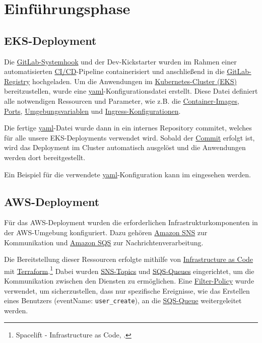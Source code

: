 \section{Einführungsphase}
\label{sec:Einfuehrungsphase}

\subsection{EKS-Deployment}
\label{sec:EKSDeployment}

Die \hyperlink{GitLabSystemhooks}{\textcolor{AOBlau}{GitLab-Systemhook}} und der Dev-Kickstarter wurden im Rahmen einer automatisierten \hyperlink{CI}{\textcolor{AOBlau}{CI/CD}}-Pipeline containerisiert und anschließend in die \hyperlink{GitLab}{\textcolor{AOBlau}{GitLab-Registry}} hochgeladen. Um die Anwendungen im \hyperlink{EKS}{\textcolor{AOBlau}{Kubernetes-Cluster (EKS)}} bereitzustellen, wurde eine \hyperlink{YAML}{\textcolor{AOBlau}{yaml}}-Konfigurationsdatei erstellt. Diese Datei definiert alle notwendigen Ressourcen und Parameter, wie z.B. die \hyperlink{ContainerImage}{\textcolor{AOBlau}{Container-Images}}, \hyperlink{Ports}{\textcolor{AOBlau}{Ports}}, \hyperlink{Umgebungsvariablen}{\textcolor{AOBlau}{Umgebungsvariablen}} und \hyperlink{KubernetesIngress}{\textcolor{AOBlau}{Ingress-Konfigurationen}}.

Die fertige \hyperlink{GitCommit}{\textcolor{AOBlau}{yaml}}-Datei wurde dann in ein internes Repository commitet, welches für alle unsere EKS-Deployments verwendet wird. Sobald der \hyperlink{GitCommit}{\textcolor{AOBlau}{Commit}} erfolgt ist, wird das Deployment im Cluster automatisch ausgelöst und die Anwendungen werden dort bereitgestellt. 

Ein Beispiel für die verwendete \hyperlink{YAML}{\textcolor{AOBlau}{yaml}}-Konfiguration kann im  eingesehen werden.

\subsection{AWS-Deployment}
\label{sec:AWSDeployment}

Für das AWS-Deployment wurden die erforderlichen Infrastrukturkomponenten in der AWS-Umgebung konfiguriert. Dazu gehören \hyperlink{SNS}{\textcolor{AOBlau}{Amazon SNS}} zur Kommunikation und \hyperlink{SQS}{\textcolor{AOBlau}{Amazon SQS}} zur Nachrichtenverarbeitung. 

Die Bereitstellung dieser Ressourcen erfolgte mithilfe von \hyperlink{InfrastructureAsCode}{\textcolor{AOBlau}{Infrastructure as Code}} mit \hyperlink{Terraform}{\textcolor{AOBlau}{Terraform}}.\footnote{Spacelift - Infrastructure as Code, \cite{Iac}.} Dabei wurden \hyperlink{SNS}{\textcolor{AOBlau}{SNS-Topics}} und \hyperlink{SQS}{\textcolor{AOBlau}{SQS-Queues}} eingerichtet, um die Kommunikation zwischen den Diensten zu ermöglichen. Eine \hyperlink{FilterPolicies}{\textcolor{AOBlau}{Filter-Policy}} wurde verwendet, um sicherzustellen, dass nur spezifische Ereignisse, wie das Erstellen eines Benutzers (eventName: \texttt{user\_create}), an die \hyperlink{SQS}{\textcolor{AOBlau}{SQS-Queue}} weitergeleitet werden. 

